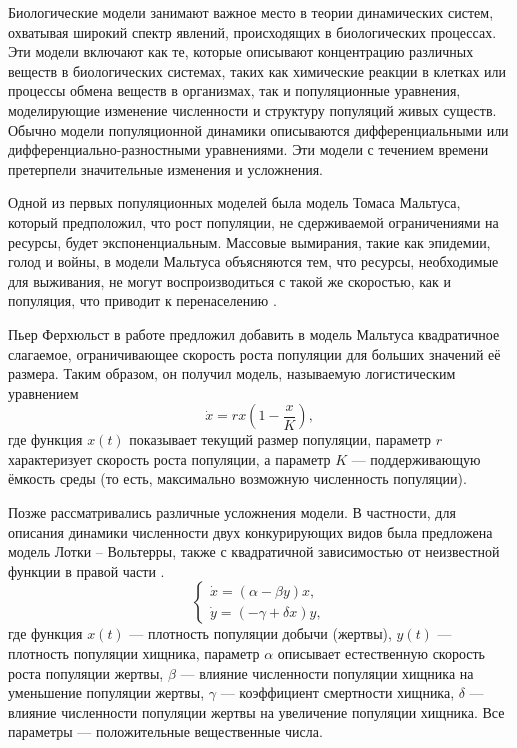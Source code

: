 
{\actuality} Биологические модели занимают важное место в теории динамических систем, охватывая широкий спектр явлений, происходящих в биологических процессах. Эти модели включают как те, которые описывают концентрацию различных веществ в биологических системах, таких как химические реакции в клетках или процессы обмена веществ в организмах, так и популяционные уравнения, моделирующие изменение численности и структуру популяций живых существ. Обычно модели популяционной динамики описываются дифференциальными или дифференциально-разностными уравнениями. 
Эти модели с течением времени претерпели значительные изменения и усложнения.

Одной из первых популяционных моделей была модель Томаса Мальтуса, который предположил, что рост популяции, не сдерживаемой ограничениями на ресурсы, будет экспоненциальным. Массовые вымирания, такие как эпидемии, голод и войны, в модели Мальтуса объясняются тем, что ресурсы, необходимые для выживания, не могут воспроизводиться с такой же скоростью, как и популяция, что приводит к перенаселению \cite{Malthus1798}.

Пьер Ферхюльст в работе \cite{Verhulst1838} предложил добавить в модель Мальтуса квадратичное слагаемое, ограничивающее скорость роста популяции для больших значений её размера. Таким образом, он получил модель, называемую логистическим уравнением
\begin{equation}
	\dot{x}=rx\left(1-\frac{x}{K}\right),
\end{equation}
где функция $x(t)$ показывает текущий размер популяции, параметр $r$ характеризует скорость роста популяции, а параметр $K$ --- поддерживающую ёмкость среды (то есть, максимально возможную численность популяции). 

Позже рассматривались различные усложнения модели. В частности, для описания динамики численности двух конкурирующих видов была предложена модель Лотки -- Вольтерры, также с квадратичной зависимостью от неизвестной функции в правой части \cite{Lotka1925, Volterra1926}.
%
\begin{equation}
	\begin{cases}
		\dot{x}=(\alpha-\beta y)x,\\
		\dot{y}=(-\gamma+\delta x)y,
	\end{cases}
\end{equation}
%
где функция $x(t)$ --- плотность популяции добычи (жертвы), $y(t)$ --- плотность популяции хищника, параметр $\alpha$ описывает естественную скорость роста популяции жертвы, $\beta$ --- влияние численности популяции хищника на уменьшение популяции жертвы, $\gamma$ --- коэффициент смертности хищника, $\delta$ --- влияние численности популяции жертвы на увеличение популяции хищника. Все параметры --- положительные вещественные числа.

